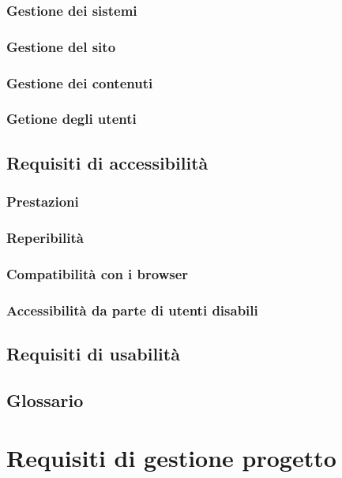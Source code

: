 \documentclass[a4paper,12pt,hidelinks]{report}
\begin{document}
	\subsection{Gestione dei sistemi}
	\subsection{Gestione del sito}
	\subsection{Gestione dei contenuti}
	\subsection{Getione degli utenti}

\section{Requisiti di accessibilità}
	\subsection{Prestazioni}
	\subsection{Reperibilità}
	\subsection{Compatibilità con i browser}
	\subsection{Accessibilità da parte di utenti disabili}

\section{Requisiti di usabilità}

\section{Glossario}


\chapter{Requisiti di gestione progetto}
\end{document}
